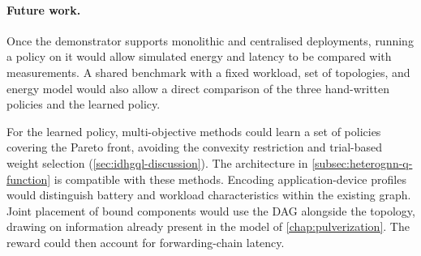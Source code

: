 \paragraph{Future work.}
Once the demonstrator supports monolithic and centralised deployments,
running a policy on it would allow simulated energy and latency to be compared with measurements.
A shared benchmark with a fixed workload, set of topologies, and energy model
would also allow a direct comparison of the three hand-written policies and the learned policy.

For the learned policy, multi-objective methods could learn a set of policies covering the Pareto front,
avoiding the convexity restriction and trial-based weight selection (\cref{sec:idhgql-discussion}).
The architecture in \cref{subsec:heterognn-q-function} is compatible with these methods.
Encoding application-device profiles would distinguish battery and workload characteristics within the existing graph.
Joint placement of bound components would use the \ac{DAG} alongside the topology,
drawing on information already present in the model of \cref{chap:pulverization}.
The reward could then account for forwarding-chain latency.





